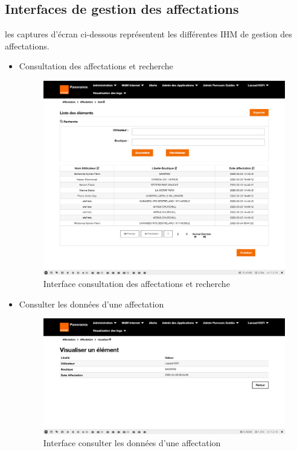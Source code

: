 \subsection{Interfaces de gestion des affectations}
les captures d'écran ci-dessous représentent les différentes IHM de gestion des affectations.
\begin{itemize}
	\item Consultation des affectations et recherche
	\begin{figure}[H]
		\centering
		\includegraphics[width=0.6\linewidth]{"img/screenshots/affectation users-boutique/index"}
		\caption[Interface consultation des affectations et recherche]{Interface consultation des affectations et recherche}
		\label{fig:index-affectation}
	\end{figure}
	
	\item Consulter les données d'une affectation
	\begin{figure}[H]
		\centering
		\includegraphics[width=0.6\linewidth]{"img/screenshots/affectation users-boutique/view"}
		\caption[Interface voir une affectation]{Interface consulter les données d'une affectation}
		\label{fig:view-affectation}
	\end{figure}


\end{itemize}
